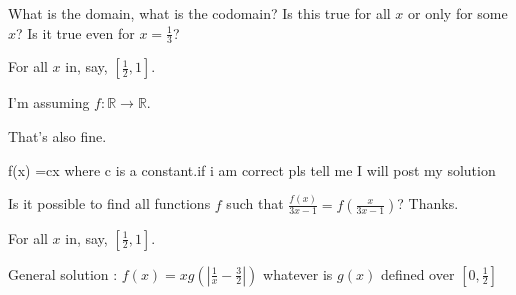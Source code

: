 \begin{solution}
	What is the domain, what is the codomain? Is this true for all $x$ or only for some $x$? Is it true even for $x = \frac{1}{3}$?
\end{solution}



\begin{solution}
	For all $x$ in, say, $\left[\frac{1}{2},1\right]$.
\end{solution}



\begin{solution}
	I'm assuming $f:\mathbb{R}\to\mathbb{R}$.
\end{solution}



\begin{solution}
	That's also fine. 
\end{solution}



\begin{solution}
	f(x) =cx where c is a constant.if i am correct pls tell me I will post my solution 
\end{solution}



\begin{solution}
	\begin{tcolorbox}Is it possible to find all functions $f$ such that $\frac{f(x)}{3x-1}=f\left(\frac{x}{3x-1}\right)$? Thanks.\end{tcolorbox}

\begin{tcolorbox}For all $x$ in, say, $\left[\frac{1}{2},1\right]$.\end{tcolorbox}

General solution : $f(x)=xg\left(\left|\frac 1x-\frac 32\right|\right)$ whatever is $g(x)$ defined over $[0,\frac 12]$
\end{solution}




